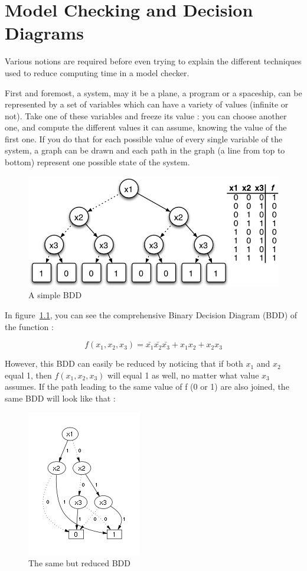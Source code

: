 \documentclass[12pt]{report}
\begin{document}
\chapter{Model Checking and Decision Diagrams}

Various notions are required before even trying to explain the different techniques used to reduce computing time in a model checker.

First and foremost, a system, may it be a plane, a program or a spaceship, can be represented by a set of variables which can have a variety of values (infinite or not). Take one of these variables and freeze its value : you can choose another one, and compute the different values it can assume, knowing the value of the first one. If you do that for each possible value of every single variable of the system, a graph can be drawn and each path in the graph (a line from top to bottom) represent one possible state of the system.

\begin{figure}[!h]
  \centering
  \includegraphics[scale=0.5]{images/basic_bdd.jpg}
  \caption{A simple BDD}
  \label{basic_bdd}
\end{figure}

In figure~\ref{basic_bdd}, you can see the comprehensive Binary Decision Diagram (BDD) of the function :

\[f(x_1,x_2,x_3) = \bar{x_1}\bar{x_2}\bar{x_3} + x_1x_2 + x_2x_3\]

However, this BDD can easily be reduced by noticing that if both $x_1$ and $x_2$ equal 1, then $f(x_1, x_2, x_3)$ will equal 1 as well, no matter what value $x_3$ assumes. If the path leading to the same value of f (0 or 1) are also joined, the same BDD will look like that :

\begin{figure}[!h]
  \centering
  \includegraphics[scale=0.8]{images/compact_bdd.jpg}
  \caption{The same but reduced BDD}
  \label{compact_bdd}
\end{figure}
\end{document}
